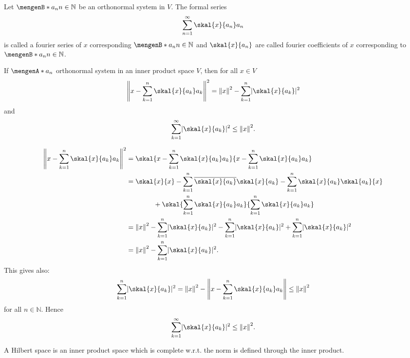 \begin{definition}
	Let $\set[a_n]{n \in \mathbb{N}}$ be an orthonormal system in $V$. The formal series 
	\[
		\sum_{n=1}^{\infty} \skal{x}{a_n}a_n
	\]
	is called a fourier series of $x$ corresponding $\set[a_n]{n \in \mathbb{N}}$ and $\skal{x}{a_n}$ are called fourier coefficients of $x$ corresponding to $\set[a_n]{n \in \mathbb{N}}$. 
\end{definition}

\begin{theorem}
	If $\set{a_n}$ orthonormal system in an inner product space $V$, then for all $x \in V$
	\[
		\norm{x- \sum_{k=1}^{n} \skal{x}{a_k}a_k}^2 = \norm{x}^2 - \sum_{k=1}^{n} \abs{\skal{x}{a_k}}^2
	\]
	and 
	\[
		\sum_{k=1}^{\infty} \abs{\skal{x}{a_k}}^2 \leq \norm{x}^2.
	\]
\end{theorem}
\begin{beweis}
	\begin{align*}
		\norm{x- \sum_{k=1}^{n} \skal{x}{a_k}a_k}^2 &= \skal{x- \sum_{k=1}^{n} \skal{x}{a_k}a_k }{x - \sum_{k=1}^{n} \skal{x}{a_k}a_k} \\
		&= \skal{x}{x} - \sum_{k=1}^{n} \overline{\skal{x}{a_k}} \skal{x}{a_k} - \sum_{k=1}^{n} \skal{x}{a_k}\skal{a_k}{x} 
		\\ & \qquad \qquad + \skal{\sum_{k=1}^{n}\skal{x}{a_k}a_k}{\sum_{k=1}^{n}\skal{x}{a_k}a_k} \\
		& = \norm{x}^2 - \sum_{k=1}^{n} \abs{\skal{x}{a_k}}^2 - \sum_{k=1}^{n} \abs{\skal{x}{a_k}}^2 + \sum_{k=1}^{n}\abs{\skal{x}{a_k}}^2  \\
		& = \norm{x}^2 - \sum_{k=1}^{n} \abs{\skal{x}{a_k}}^2.
	\end{align*}
	This gives also:
	\[
		\sum_{k=1}^{n}\abs{\skal{x}{a_k}}^2 = \norm{x}^2 - \norm{x - \sum_{k=1}^{n} \skal{x}{a_k}a_k} \leq \norm{x}^2 
	\]
	for all $n \in \mathbb{N}$. Hence
	\[
		\sum_{k=1}^{\infty} \abs{\skal{x}{a_k}}^2 \leq \norm{x}^2.
	\]
\end{beweis}

\begin{definition}
	A Hilbert space is an inner product space which is complete w.r.t. the norm is defined through the inner product.
\end{definition}


